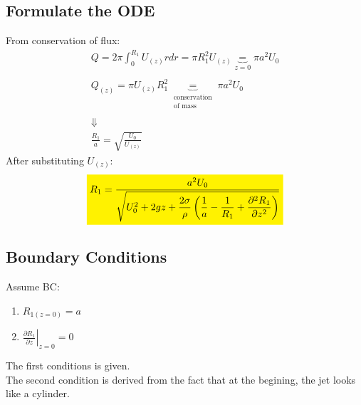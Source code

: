 \documentclass[11pt, a4paper]{article}
\begin{document}
\subsection{Formulate the ODE}
From conservation of flux:
\begin{equation}
    \begin{array}{c}
        \displaystyle Q=2\pi\int_0^{R_1}U_{\left(z\right)}rdr=\pi R_1^2U_{\left(z\right)}\underbrace{=}_{z=0}\pi a^2U_0 \\\\
        Q_{\left(z\right)}=\pi U_{\left(z\right)}R_1^2\underbrace{=}_{\substack{\text{conservation}\\\text{of mass}}}\pi a^2U_0 \\\\
        \Downarrow \\
        \displaystyle \frac{R_1}{a}=\sqrt{\frac{U_0}{U_{\left(z\right)}}}
    \end{array}
\end{equation}
After substituting $U_{\left(z\right)}$:
\begin{equation}
    \colorbox{yellow}{$\displaystyle R_1=\frac{a^2U_0}{\displaystyle\sqrt{U_0^2+2gz+\frac{2\sigma}{\rho}\left(\frac{1}{a}-\frac{1}{R_1}+\frac{\partial^2 R_1}{\partial z^2}\right)}}$}
\end{equation}

\subsection{Boundary Conditions}
Assume BC:
\begin{enumerate}
    \item $R_{1\left(z=0\right)}=a$
    \item $\displaystyle\left.\frac{\partial R_1}{\partial z}\right|_{z=0}=0$
\end{enumerate}
The first conditions is given. \\
The second condition is derived from the fact that at the begining, the jet looks like a cylinder.
\newpage
\end{document}
